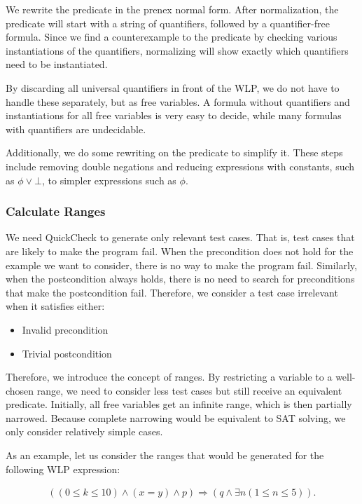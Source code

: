 \documentclass[a4paper]{article}
\begin{document}
We rewrite the predicate in the prenex normal form. After normalization, the
predicate will start with a string of quantifiers, followed by a quantifier-free
formula. Since we find a counterexample to the predicate by checking various
instantiations of the quantifiers, normalizing will show exactly which
quantifiers need to be instantiated.

By discarding all universal quantifiers in front of the WLP, we do not have to
handle these separately, but as free variables. A formula without quantifiers
and instantiations for all free variables is very easy to decide, while many
formulas with quantifiers are undecidable.

Additionally, we do some rewriting on the predicate to simplify it. These steps
include removing double negations and reducing expressions with constants,
such as $\phi \vee \bot$, to simpler expressions such as $\phi$.

\subsubsection*{Calculate Ranges}

We need QuickCheck to generate only relevant test cases. That is, test cases that
are likely to make the program fail. When the precondition does not hold
for the example we want to consider, there is no way to make the program fail.
Similarly, when the postcondition always holds, there is no need to search for
preconditions that make the postcondition fail. Therefore, we consider a test
case irrelevant when it satisfies either:

\begin{itemize}
\item Invalid precondition
\item Trivial postcondition
\end{itemize}

Therefore, we introduce the concept of ranges. By restricting a variable to a
well-chosen range, we need to consider less test cases but still receive an
equivalent predicate. Initially, all free variables get an infinite range, which
is then partially narrowed. Because complete narrowing would be equivalent to
SAT solving, we only consider relatively simple cases.

As an example, let us consider the ranges that would be generated for the following WLP
expression:

\begin{align*}
	((0 \leq k \leq 10) \wedge (x = y) \wedge p) \Rightarrow (q \wedge \exists n (1 \leq n \leq 5)).
\end{align*}
\end{document}

